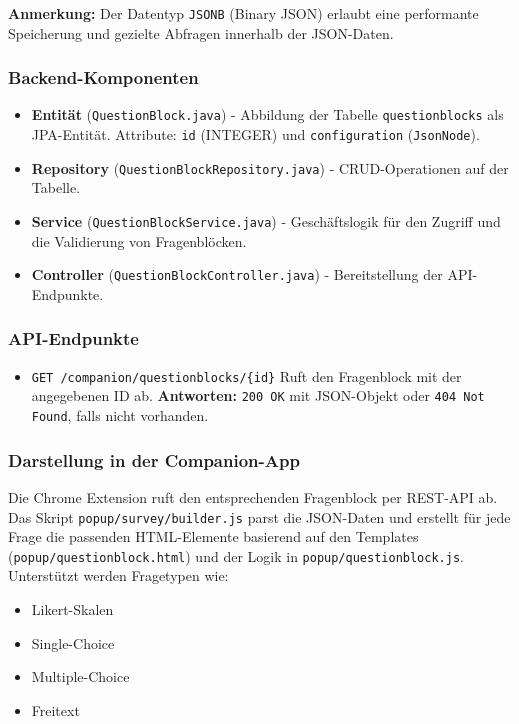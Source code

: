 \documentclass[12pt,a4paper]{report}
\begin{document}
        \noindent
        \textbf{Anmerkung:} Der Datentyp \texttt{JSONB} (Binary JSON) erlaubt eine performante Speicherung und gezielte Abfragen innerhalb der JSON-Daten.

    \subsubsection{Backend-Komponenten}
        \begin{itemize}
            \item \textbf{Entität} (\texttt{QuestionBlock.java}) - Abbildung der Tabelle \texttt{questionblocks} als JPA-Entität.
                Attribute: \texttt{id} (INTEGER) und \texttt{configuration} (\texttt{JsonNode}).
            \item \textbf{Repository} (\texttt{QuestionBlockRepository.java}) - CRUD-Operationen auf der Tabelle.
            \item \textbf{Service} (\texttt{QuestionBlockService.java}) - Geschäftslogik für den Zugriff und die Validierung von Fragenblöcken.
            \item \textbf{Controller} (\texttt{QuestionBlockController.java}) - Bereitstellung der API-Endpunkte.
        \end{itemize}

    \subsubsection{API-Endpunkte}
        \begin{itemize}
            \item \texttt{GET /companion/questionblocks/\{id\}}
                Ruft den Fragenblock mit der angegebenen ID ab.
                \textbf{Antworten:} \texttt{200 OK} mit JSON-Objekt oder \texttt{404 Not Found}, falls nicht vorhanden.
        \end{itemize}

    \subsubsection{Darstellung in der Companion-App}
        Die Chrome Extension ruft den entsprechenden Fragenblock per REST-API ab.
        Das Skript \texttt{popup/survey/builder.js} parst die JSON-Daten und erstellt für jede Frage die passenden HTML-Elemente
        basierend auf den Templates (\texttt{popup/questionblock.html}) und der Logik in \texttt{popup/questionblock.js}.
        Unterstützt werden Fragetypen wie:
        \begin{itemize}
            \item Likert-Skalen
            \item Single-Choice
            \item Multiple-Choice
            \item Freitext
        \end{itemize}
\end{document}
